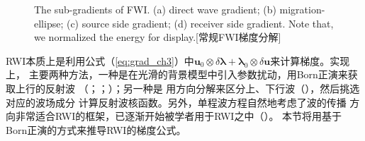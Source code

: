 \begin{figure}[!htbp]
	\centering
	{The sub-gradients of FWI. (a) direct wave gradient; 
	(b) migration-ellipse; (c) source side gradient; (d) receiver side gradient.
	 Note that, we normalized the energy for display.}[常规FWI梯度分解]
	\label{fig:grad}
\end{figure}

RWI本质上是利用公式（\ref{eq:grad_ch3}）中$\mathbf{u}_0\otimes\delta\mathbf{\lambda}
+\mathbf{\lambda}_0\otimes\delta\mathbf{u}$来计算梯度。实现上，
主要两种方法，一种是在光滑的背景模型中引入参数扰动，用Born正演来获取上行的反射波
（；；）；另一种是
用方向分解来区分上、下行波（），然后挑选对应的波场成分
计算反射波核函数。另外，单程波方程自然地考虑了波的传播
方向非常适合RWI的框架，已逐渐开始被学者用于RWI之中（）。
本节将用基于Born正演的方式来推导RWI的梯度公式。

